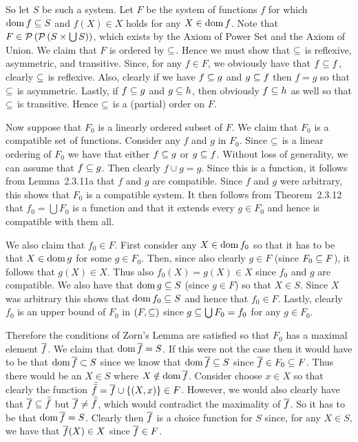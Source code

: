\begin{questions}
{{    So let $S$ be such a system.
    Let $F$ be the system of functions $f$ for which $\dom{f} \ss S$ and $f(X) \in X$ holds for any $X \in \dom{f}$.
    Note that $F \in \pset{\pset{S \times \bigcup S}}$, which exists by the Axiom of Power Set and the Axiom of Union.
    We claim that $F$ is ordered by $\ss$.
    Hence we must show that $\ss$ is reflexive, asymmetric, and transitive.
    Since, for any $f \in F$, we obviously have that $f \ss f$, clearly $\ss$ is reflexive.
    Also, clearly if we have $f \ss g$ and $g \ss f$ then $f=g$ so that $\ss$ is asymmetric.
    Lastly, if $f \ss g$ and $g \ss h$, then obviously $f \ss h$ as well so that $\ss$ is transitive.
    Hence $\ss$ is a (partial) order on $F$.

    Now suppose that $F_0$ is a linearly ordered subset of $F$.
    We claim that $F_0$ is a compatible set of functions.
    Consider any $f$ and $g$ in $F_0$.
    Since $\ss$ is a linear ordering of $F_0$ we have that either $f \ss g$ or $g \ss f$.
    Without loss of generality, we can assume that $f \ss g$.
    Then clearly $f \cup g = g$.
    Since this is a function, it follows from Lemma~2.3.11a that $f$ and $g$ are compatible.
    Since $f$ and $g$ were arbitrary, this shows that $F_0$ is a compatible system.
    It then follows from Theorem~2.3.12 that $f_0 = \bigcup F_0$ is a function and that it extends every $g \in F_0$ and hence is compatible with them all.

    We also claim that $f_0 \in F$.
    First consider any $X \in \dom{f_0}$ so that it has to be that $X \in \dom{g}$ for some $g \in F_0$.
    Then, since also clearly $g \in F$ (since $F_0 \ss F$), it follows that $g(X) \in X$.
    Thus also $f_0(X) = g(X) \in X$ since $f_0$ and $g$ are compatible.
    We also have that $\dom{g} \ss S$ (since $g \in F$) so that $X \in S$.
    Since $X$ was arbitrary this shows that $\dom{f_0} \ss S$ and hence that $f_0 \in F$.
    Lastly, clearly $f_0$ is an upper bound of $F_0$ in $(F, \ss)$ since $g \ss \bigcup F_0 = f_0$ for any $g \in F_0$.

    Therefore the conditions of Zorn's Lemma are satisfied so that $F_0$ has a maximal element $\fb$.
    We claim that $\dom{\fb} = S$.
    If this were not the case then it would have to be that $\dom{\fb} \pss S$ since we know that $\dom{\fb} \ss S$ since $\fb \in F_0 \ss F$.
    Thus there would be an $X \in S$ where $X \notin \dom{\fb}$.
    Consider choose $x \in X$ so that clearly the function $\fbb = \fb \cup \braces{(X, x)} \in F$.
    However, we would also clearly have that $\fb \ss \fbb$ but $\fb \neq \fbb$, which would contradict the maximality of $\fb$.
    So it has to be that $\dom{\fb} = S$.
    Clearly then $\fb$ is a choice function for $S$ since, for any $X \in S$, we have that $\fb(X) \in X$ since $\fb \in F$.
  }
}


\end{questions}
